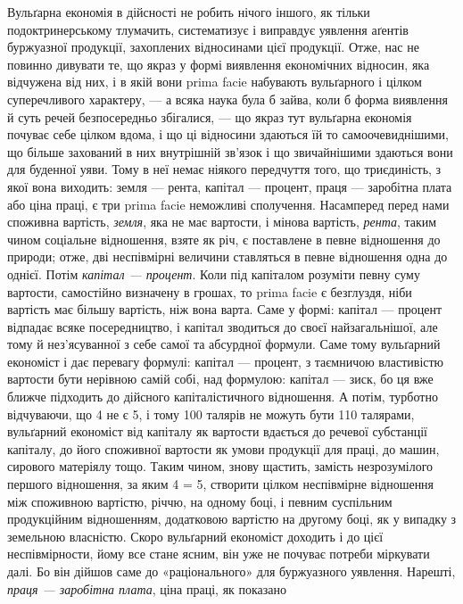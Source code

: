 Вульґарна економія в дійсності не робить нічого іншого, як тільки подоктринерському
тлумачить, систематизує і виправдує уявлення аґентів буржуазної
продукції, захоплених відносинами цієї продукції. Отже, нас не повинно
дивувати те, що якраз у формі виявлення економічних відносин, яка відчужена
від них, і в якій вони prima facie набувають вульґарного і цілком суперечливого
характеру, — а всяка наука була б зайва, коли б форма виявлення й суть
речей безпосередньо збігалися, — що якраз тут вульґарна економія почуває себе
цілком вдома, і що ці відносини здаються їй то самоочевиднішими, що більше
захований в них внутрішній зв’язок і що звичайнішими здаються вони для
буденної уяви. Тому в неї немає ніякого передчуття того, що триєдиність,
з якої вона виходить: земля — рента, капітал — процент, праця — заробітна плата
або ціна праці, є три prima facie неможливі сполучення. Насамперед перед
нами споживна вартість, \emph{земля}, яка не має вартости, і мінова вартість, \emph{рента},
таким чином соціальне відношення, взяте як річ, є поставлене в певне
відношення до природи; отже, дві неспівмірні величини ставляться в певне
відношення одна до однієї. Потім \emph{капітал — процент}. Коли під капіталом
розуміти певну суму вартости, самостійно визначену в грошах, то prima facie
є безглуздя, ніби вартість має більшу вартість, ніж вона варта. Саме у формі:
капітал — процент відпадає всяке посередництво, і капітал зводиться до своєї
найзагальнішої, але тому й нез’ясуванної з себе самої та абсурдної формули.
Саме тому вульґарний економіст і дає перевагу формулі: капітал — процент,
з таємничою властивістю вартости бути нерівною самій собі, над формулою:
капітал — зиск, бо ця вже ближче підходить до дійсного капіталістичного відношення.
А потім, турботно відчуваючи, що 4 не є 5, і тому 100 талярів не
можуть бути 110 талярами, вульґарний економіст від капіталу як вартости
вдається до речевої субстанції капіталу, до його споживної вартости як умови
продукції для праці, до машин, сирового матеріялу тощо. Таким чином, знову
щастить, замість незрозумілого першого відношення, за яким 4 = 5, створити
цілком неспівмірне відношення між споживною вартістю, річчю, на одному боці,
і певним суспільним продукційним відношенням, додатковою вартістю на другому
боці, як у випадку з земельною власністю. Скоро вульґарний економіст
доходить і до цієї неспівмірности, йому все стане ясним, він уже не почуває
потреби міркувати далі. Бо він дійшов саме до «раціонального» для буржуазного
уявлення. Нарешті, \emph{праця — заробітна плата}, ціна праці, як показано
\parbreak{}  %
